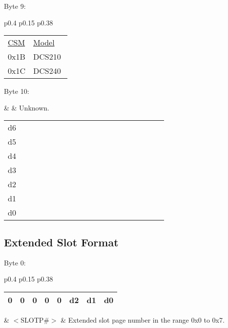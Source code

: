 Byte 9:

\begin{tabular}{p{0.4\linewidth} p{0.15\linewidth} p{0.38\linewidth}} 

\begin{tabular}{|p{0.3cm}|p{0.3cm}|p{0.3cm}|p{0.3cm}|p{0.3cm}|p{0.3cm}|p{0.3cm}|p{0.3cm}|}
\hline
0 & n & n & n & n & n & n & n\\
\hline
\end{tabular}
& $<$CSM$>$ & Command station model.\\
\end{tabular}

\begin{tabular}{p{0.1\linewidth} p{0.6\linewidth}} 
\underline{CSM} & \underline{Model}\\
0x1B & DCS210\\
0x1C & DCS240\\
\end{tabular}

Byte 10:

&  & Unknown.\\
\end{tabular}

\begin{tabular}{p{0.05\linewidth} p{0.6\linewidth}} 
d6 & \\
d5 & \\
d4 & \\
d3 & \\
d2 & \\
d1 & \\
d0 & \\
\end{tabular}

\subsection{Extended Slot Format}

Byte 0:

\begin{tabular}{p{0.4\linewidth} p{0.15\linewidth} p{0.38\linewidth}} 

\begin{tabular}{|p{0.3cm}|p{0.3cm}|p{0.3cm}|p{0.3cm}|p{0.3cm}|p{0.3cm}|p{0.3cm}|p{0.3cm}|}
\hline
0 & 0 & 0 & 0 & 0 & d2 & d1 & d0\\
\hline
\end{tabular}
& $<$SLOTP\#$>$ & Extended slot page number in the range 0x0 to 0x7.\\
\end{tabular}

